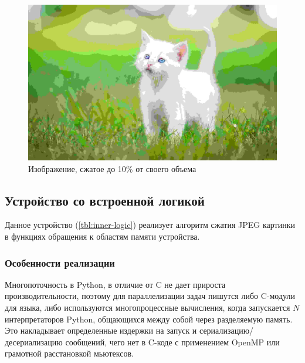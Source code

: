 \begin{figure}[!htbp]
    \centering
    \begin{adjustbox}{max totalsize={0.8\textwidth}{\textheight}}
        \includegraphics{images/image_after_compression.jpg}
    \end{adjustbox}
    \caption{Изображение, сжатое до 10\% от своего объема}\label{fig:image-after-compression}
\end{figure}

\subsection{Устройство со встроенной логикой}\label{sec:ch3/sec2/sec1}

Данное устройство (\cref{tbl:inner-logic}) реализует алгоритм сжатия JPEG картинки в функциях обращения
к областям памяти устройства.

\subsubsection{Особенности реализации}\label{sec:ch3/sec2/sec1/sec1}

Многопоточность в Python, в отличие от C не дает прироста производительности,
поэтому для параллелизации задач пишутся либо C-модули для языка, либо используются
многопроцессные вычисления, когда запускается $N$ интерпретаторов Python, общающихся
между собой через разделяемую память. Это накладывает определенные издержки на запуск
и сериализацию/десериализацию сообщений, чего нет в C-коде с применением OpenMP или
грамотной расстановкой мьютексов.

